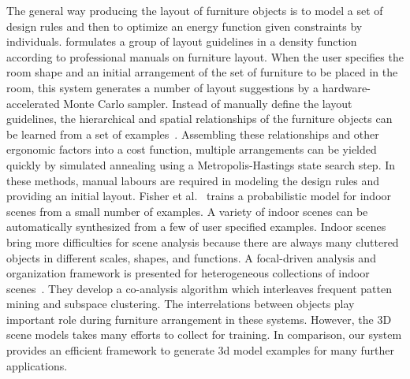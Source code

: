 The general way producing the layout of furniture objects is to model a set of design rules and then to optimize an energy function given constraints by individuals.
%
\cite{Merrell11} formulates a group of layout guidelines in a density function according to professional manuals on furniture layout.
When the user specifies the room shape and an initial arrangement of the set of furniture to be placed in the room, this system generates a number of layout suggestions by a hardware-accelerated Monte Carlo sampler.
%
Instead of manually define the layout guidelines, the hierarchical and spatial relationships of the furniture objects can be learned from a set of examples~\cite{craigyu2011furniture}.
Assembling these relationships and other ergonomic factors into a cost function, multiple arrangements can be yielded quickly by simulated annealing using a Metropolis-Hastings state search step.
%
In these methods, manual labours are required in modeling the design rules and providing an initial layout.
%
Fisher et al.~ trains a probabilistic model for indoor scenes from a small number of examples.
A variety of indoor scenes can be automatically synthesized from a few of user specified examples.
%
Indoor scenes bring more difficulties for scene analysis because there are always many cluttered objects in different scales, shapes, and functions.
A focal-driven analysis and organization framework is presented for heterogeneous collections of indoor scenes~\cite{xu_sig14}.
They develop a co-analysis algorithm which interleaves frequent patten mining and subspace clustering.
The interrelations between objects play important role during furniture arrangement in these systems.
However, the 3D scene models takes many efforts to collect for training.
In comparison, our system provides an efficient framework to generate 3d model examples for many further applications.






